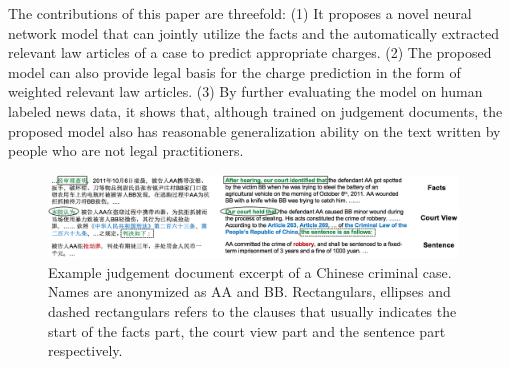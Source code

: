 

The contributions of this paper are threefold: 
(1) It proposes a novel neural network model that can jointly utilize the facts and the automatically extracted relevant law articles of a case to predict appropriate charges.
(2) The proposed model can also provide legal basis for the charge prediction in the form of weighted relevant law articles.
(3) By further evaluating the model on human labeled news data, it shows that, although trained on judgement documents, the proposed model also has reasonable generalization ability on the text written by people who are not legal practitioners.


\begin{figure}[t!]
\begin{center}
\includegraphics[width=0.97\textwidth]{figures/case.png}	
\caption{Example judgement document excerpt of a Chinese criminal case. Names are anonymized as AA and BB.
Rectangulars, ellipses and dashed rectangulars refers to the clauses that usually indicates the start of the facts part, the court view part and the sentence part respectively.
}
\label{fig_example_case}
\end{center}
\end{figure}
